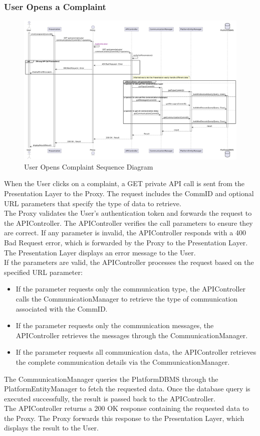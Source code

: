 \subsubsection*{User Opens a Complaint}
\begin{figure}[H]
    \centering
    \includegraphics[width=\linewidth]{Latex/Images/DD/SequenceDiagrams/16UserOpensComplaint.png}
    \caption{User Opens Complaint Sequence Diagram}
    \label{fig:usopencomp}
\end{figure}
When the User clicks on a complaint, a GET private API call is sent from the Presentation Layer to the Proxy. The request includes the CommID and optional URL parameters that specify the type of data to retrieve.
\\
The Proxy validates the User's authentication token and forwards the request to the APIController. The APIController verifies the call parameters to ensure they are correct. If any parameter is invalid, the APIController responds with a 400 Bad Request error, which is forwarded by the Proxy to the Presentation Layer. The Presentation Layer displays an error message to the User.\\
If the parameters are valid, the APIController processes the request based on the specified URL parameter:
\begin{itemize}
\item If the parameter requests only the communication type, the APIController calls the CommunicationManager to retrieve the type of communication associated with the CommID.
\item If the parameter requests only the communication messages, the APIController retrieves the messages through the CommunicationManager.
\item  If the parameter requests all communication data, the APIController retrieves the complete communication details via the CommunicationManager.
\end{itemize}
The CommunicationManager queries the PlatformDBMS through the PlatformEntityManager to fetch the requested data. Once the database query is executed successfully, the result is passed back to the APIController.\\
The APIController returns a 200 OK response containing the requested data to the Proxy. The Proxy forwards this response to the Presentation Layer, which displays the result to the User.
